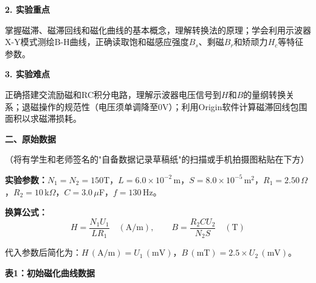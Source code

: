 \documentclass[a4paper,12pt]{article}
\begin{document}
\vspace{0.5cm}

{\fontsize{14pt}{20pt}\selectfont \textbf{2. 实验重点}}

\vspace{0.3cm}

{\fontsize{12pt}{18pt}\selectfont

掌握磁滞、磁滞回线和磁化曲线的基本概念，理解转换法的原理；学会利用示波器X-Y模式测绘B-H曲线，正确读取饱和磁感应强度$B_s$、剩磁$B_r$和矫顽力$H_c$等特征参数。

}

\vspace{0.5cm}

{\fontsize{14pt}{20pt}\selectfont \textbf{3. 实验难点}}

\vspace{0.3cm}

{\fontsize{12pt}{18pt}\selectfont

正确搭建交流励磁和RC积分电路，理解示波器电压信号到$H$和$B$的量纲转换关系；退磁操作的规范性（电压须单调降至0V）；利用Origin软件计算磁滞回线包围面积以求磁滞损耗。

}

\newpage

{\fontsize{16pt}{24pt}\selectfont \textbf{二、原始数据}}

\vspace{0.3cm}
{\fontsize{12pt}{18pt}\selectfont （将有学生和老师签名的"自备数据记录草稿纸"的扫描或手机拍摄图粘贴在下方）}

\vspace{0.5cm}

{\fontsize{12pt}{18pt}\selectfont

\textbf{实验参数：}$N_1 = N_2 = 150$T，$L = 6.0 \times 10^{-2}$\,m，$S = 8.0 \times 10^{-5}$\,m$^2$，$R_1 = 2.50\,\Omega$，$R_2 = 10\,$k$\Omega$，$C = 3.0\,\mu$F，$f = 130$\,Hz。

\textbf{换算公式：}
\begin{equation}
H = \frac{N_1 U_1}{L R_1} \quad(\text{A/m}), \qquad
B = \frac{R_2 C U_2}{N_2 S} \quad(\text{T})
\end{equation}

代入参数后简化为：$H\,(\text{A/m}) = U_1\,(\text{mV})$，$B\,(\text{mT}) = 2.5 \times U_2\,(\text{mV})$。

}

\vspace{0.5cm}

{\fontsize{12pt}{18pt}\selectfont \textbf{表1：初始磁化曲线数据}}
\end{document}
